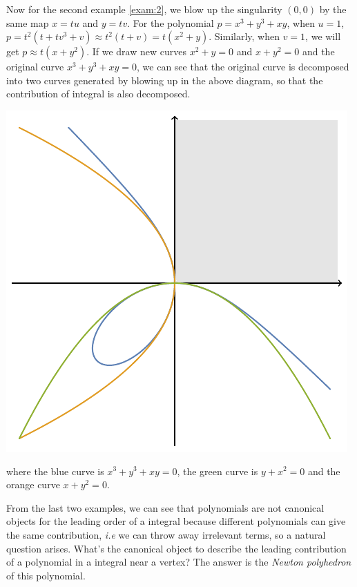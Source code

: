 \documentclass[12pt]{article}
\theoremstyle{definition}
\theoremstyle{plain}
\begin{document}
Now for the second example \eqref{exam:2}, we 
blow up the singularity $(0,0)$ by the same map $x=tu$ and $y=tv$. For the polynomial $p=x^3+y^3+x y$,
when $u=1$, 
$p=t^2(t +t v^3+ v)\approx t^2(t+v)=t(x^2+y)$. 
Similarly, when $v=1$, we will get $p\approx t(x+y^2)$. 
If we draw new curves $x^2+y=0$ and $x+y^2=0$ and the original curve $x^3+y^3+xy=0$, 
we can see that the original curve is 
decomposed into two curves generated by blowing up in the above diagram, 
so that the contribution of integral is also decomposed.
\begin{center}
	\includegraphics[scale=0.7]{fig_2.pdf}	
\end{center}
where the blue curve is $x^3+y^3+xy=0$, the green curve is $y+x^2=0$ and
the orange curve $x+y^2=0$.


From the last two examples, we can see that polynomials are not canonical objects 
for the leading order of a integral because different polynomials can give the 
same contribution, \textit{i.e} we can throw away irrelevant terms, 
so a natural question arises. What's the canonical object to describe the 
leading contribution of a polynomial in a integral near a vertex? The answer is 
the \textit{Newton polyhedron} of this polynomial.
\end{document}
